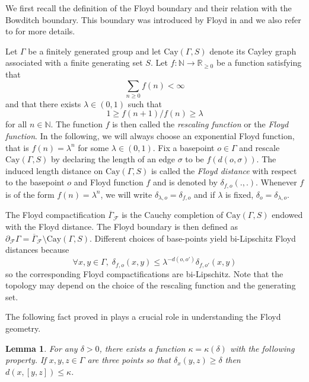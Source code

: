 \documentclass{amsart}
\newtheorem{lem}[thm]{Lemma}
\theoremstyle{definition}
\theoremstyle{remark}
\newcommand{\Gx }{\mathrm{Cay}(\Gamma, S)}
\begin{document}
We first recall the definition of   the Floyd boundary and their relation with the Bowditch boundary.
This boundary was introduced by Floyd in \cite{Floyd} and we also refer to \cite{Karlssonfreesubgroups} for more details.

Let $\Gamma$ be a finitely generated group and let $\Gx$ denote its Cayley graph associated with a finite generating set $S$.
Let $f:\mathbb{N}\to \mathbb{R}_{\ge 0}$ be a function satisfying that
$$\sum_{n\geq 0}f(n)<\infty$$ and that there exists $\lambda\in (0,1)$ such that
$$1\geq f({n+1})/f(n)\geq\lambda$$ for all $n \in \mathbb{N}$.
The function $f$ is then called the {\it rescaling function} or the \textit{Floyd function}.
In the following, we will always choose an exponential Floyd function, that is $f(n)=\lambda^n$ for some $\lambda\in (0,1)$.
Fix a basepoint $o\in \Gamma$ and rescale $\Gx$ by declaring the length of an edge $\sigma$ to be $f(d(o,\sigma))$.
The induced length distance on $\Gx$ is called the {\it Floyd distance} with respect to the basepoint $o$ and Floyd function $f$ and is denoted by $\delta_{f,o}(.,.)$.
Whenever $f$ is of the form $f(n)=\lambda^n$, we will write $\delta_{\lambda,o}=\delta_{f,o}$ and if $\lambda$ is fixed, $\delta_o=\delta_{\lambda,o}$.

The Floyd compactification $\overline{\Gamma}_{\mathcal{F}}$  is the Cauchy completion of $\Gx$ endowed with the Floyd distance.
The Floyd boundary is then defined as $\partial_{\mathcal{F}}\Gamma=\overline{\Gamma}_{\mathcal{F}}\setminus \Gx$. Different choices of base-points yield bi-Lipschitz Floyd distances because
\begin{equation}\label{changeofbasepointFloyd}
\forall x,y\in \Gamma,\; \delta_{f,o}(x,y) \le \lambda^{-d(o,o')} \delta_{f,o'}(x,y) 
\end{equation}
so the corresponding Floyd compactifications are bi-Lipschitz. Note  that the topology  may  depend on the choice of the rescaling function and the generating set. 

The following fact proved in   \cite{Karlssonfreesubgroups} plays a crucial role in understanding the Floyd geometry.
\begin{lem}\label{Karlssonlem}\cite[Lemma~1]{Karlssonfreesubgroups}
For any $\delta>0$, there exists a function $\kappa=\kappa(\delta)$ with the following property.
If  $x,y,z\in \Gamma$ are three points so that $\delta_x(y,z)\ge \delta$ then $d(x, [y,z])\le \kappa$.    
\end{lem}
\end{document}
